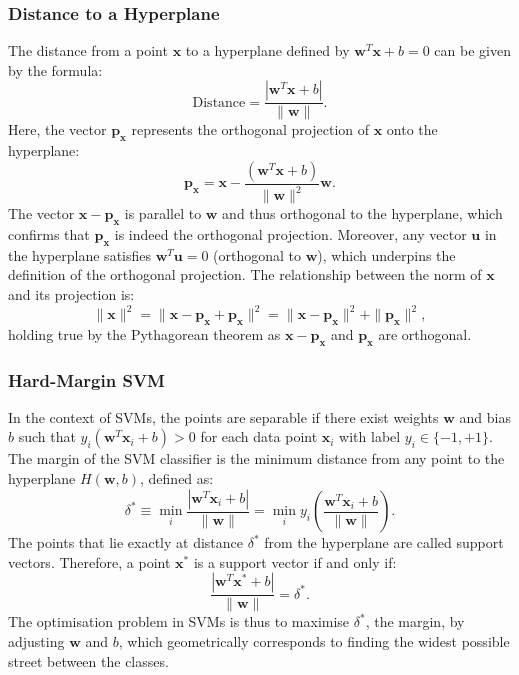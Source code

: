 \subsubsection*{Distance to a Hyperplane}
The distance from a point \( \mathbf{x} \) to a hyperplane defined by \( \mathbf{w}^T \mathbf{x} + b = 0 \) can be given by the formula:
\[
\text{Distance} = \frac{|\mathbf{w}^T \mathbf{x} + b|}{\|\mathbf{w}\|}.
\]
Here, the vector \( \mathbf{p}_{\mathbf{x}} \) represents the orthogonal projection of \( \mathbf{x} \) onto the hyperplane:
\[
\mathbf{p}_{\mathbf{x}} = \mathbf{x} - \frac{(\mathbf{w}^T \mathbf{x} + b)}{\|\mathbf{w}\|^2}\mathbf{w}.
\]
The vector \( \mathbf{x} - \mathbf{p}_{\mathbf{x}} \) is parallel to \( \mathbf{w} \) and thus orthogonal to the hyperplane, which confirms that \( \mathbf{p}_{\mathbf{x}} \) is indeed the orthogonal projection. Moreover, any vector \( \mathbf{u} \) in the hyperplane satisfies \( \mathbf{w}^T \mathbf{u} = 0 \) (orthogonal to \( \mathbf{w} \)), which underpins the definition of the orthogonal projection. The relationship between the norm of \( \mathbf{x} \) and its projection is:
\[
\|\mathbf{x}\|^2 = \|\mathbf{x} - \mathbf{p}_{\mathbf{x}} + \mathbf{p}_{\mathbf{x}}\|^2 = \|\mathbf{x} - \mathbf{p}_{\mathbf{x}}\|^2 + \|\mathbf{p}_{\mathbf{x}}\|^2,
\]
holding true by the Pythagorean theorem as \( \mathbf{x} - \mathbf{p}_{\mathbf{x}} \) and \( \mathbf{p}_{\mathbf{x}} \) are orthogonal.

\subsubsection*{Hard-Margin SVM}
In the context of SVMs, the points are separable if there exist weights \( \mathbf{w} \) and bias \( b \) such that \( y_i(\mathbf{w}^T \mathbf{x}_i + b) > 0 \) for each data point \( \mathbf{x}_i \) with label \( y_i \in \{-1, +1\} \). The margin of the SVM classifier is the minimum distance from any point to the hyperplane \( H(\mathbf{w}, b) \), defined as:
\[
\delta^* \equiv \min_i \frac{|\mathbf{w}^T \mathbf{x}_i + b|}{\|\mathbf{w}\|} = \min_i y_i\left(\frac{\mathbf{w}^T \mathbf{x}_i + b}{\|\mathbf{w}\|}\right).
\]
The points that lie exactly at distance \( \delta^* \) from the hyperplane are called support vectors. Therefore, a point \( \mathbf{x}^* \) is a support vector if and only if:
\[
\frac{|\mathbf{w}^T \mathbf{x}^* + b|}{\|\mathbf{w}\|} = \delta^*.
\]
The optimisation problem in SVMs is thus to maximise \( \delta^* \), the margin, by adjusting \( \mathbf{w} \) and \( b \), which geometrically corresponds to finding the widest possible street between the classes.

